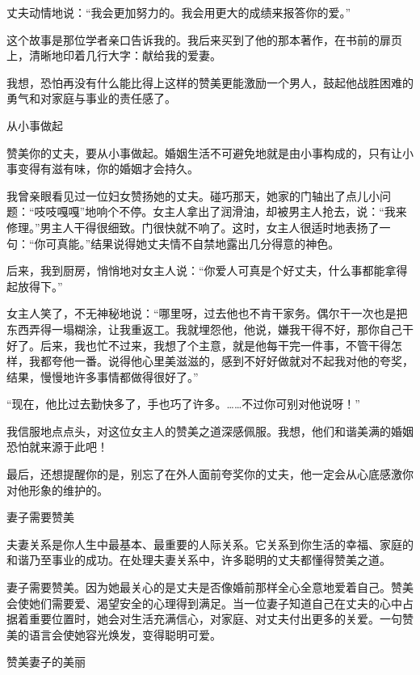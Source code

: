 \documentclass[12pt,UTF8]{ctexbook}
\begin{document}
丈夫动情地说：“我会更加努力的。我会用更大的成绩来报答你的爱。”

这个故事是那位学者亲口告诉我的。我后来买到了他的那本著作，在书前的扉页上，清晰地印着几行大字：献给我的爱妻。

我想，恐怕再没有什么能比得上这样的赞美更能激励一个男人，鼓起他战胜困难的勇气和对家庭与事业的责任感了。





从小事做起


赞美你的丈夫，要从小事做起。婚姻生活不可避免地就是由小事构成的，只有让小事变得有滋有味，你的婚姻才会持久。

我曾亲眼看见过一位妇女赞扬她的丈夫。碰巧那天，她家的门轴出了点儿小问题：“吱吱嘎嘎”地响个不停。女主人拿出了润滑油，却被男主人抢去，说：“我来修理。”男主人干得很细致。门很快就不响了。这时，女主人很适时地表扬了一句：“你可真能。”结果说得她丈夫情不自禁地露出几分得意的神色。

后来，我到厨房，悄悄地对女主人说：“你爱人可真是个好丈夫，什么事都能拿得起放得下。”

女主人笑了，不无神秘地说：“哪里呀，过去他也不肯干家务。偶尔干一次也是把东西弄得一塌糊涂，让我重返工。我就埋怨他，他说，嫌我干得不好，那你自己干好了。后来，我也忙不过来，我想了个主意，就是他每干完一件事，不管干得怎样，我都夸他一番。说得他心里美滋滋的，感到不好好做就对不起我对他的夸奖，结果，慢慢地许多事情都做得很好了。”

“现在，他比过去勤快多了，手也巧了许多。……不过你可别对他说呀！”

我信服地点点头，对这位女主人的赞美之道深感佩服。我想，他们和谐美满的婚姻恐怕就来源于此吧！

最后，还想提醒你的是，别忘了在外人面前夸奖你的丈夫，他一定会从心底感激你对他形象的维护的。





妻子需要赞美


夫妻关系是你人生中最基本、最重要的人际关系。它关系到你生活的幸福、家庭的和谐乃至事业的成功。在处理夫妻关系中，许多聪明的丈夫都懂得赞美之道。

妻子需要赞美。因为她最关心的是丈夫是否像婚前那样全心全意地爱着自己。赞美会使她们需要爱、渴望安全的心理得到满足。当一位妻子知道自己在丈夫的心中占据着重要位置时，她会对生活充满信心，对家庭、对丈夫付出更多的关爱。一句赞美的语言会使她容光焕发，变得聪明可爱。





赞美妻子的美丽
\end{document}
